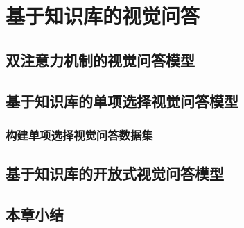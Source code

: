 \chapter{基于知识库的视觉问答}
\section{双注意力机制的视觉问答模型}

\section{基于知识库的单项选择视觉问答模型}

\subsection{构建单项选择视觉问答数据集}

\section{基于知识库的开放式视觉问答模型}

\section{本章小结}
